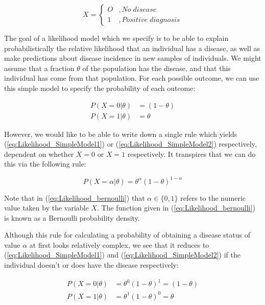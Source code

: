 \documentclass[11pt,fullpage]{book}
\begin{document}
\begin{equation}
X =
\begin{cases}
O & , No\; disease \\
1 & , Positive \; diagnosis
\end{cases}
\end{equation}

The goal of a likelihood model which we specify is to be able to explain probabilistically the relative likelihood that an individual has a disease, as well as make predictions about disease incidence in new samples of individuals. We might assume that a fraction $\theta$ of the population has the disease, and that this individual has come from that population. For each possible outcome, we can use this simple model to specify the probability of each outcome:

\begin{align}\label{eq:Likelihood_SimpleModel1}
P(X = 0|\theta)& = (1-\theta)\\
P(X = 1|\theta)& = \theta\label{eq:Likelihood_SimpleModel2}
\end{align}

However, we would like to be able to write down a single rule which yields (\ref{eq:Likelihood_SimpleModel1}) or (\ref{eq:Likelihood_SimpleModel2}) respectively, dependent on whether $X=0$ or $X=1$ respectively. It transpires that we can do this via the following rule:

\begin{equation}\label{eq:Likelihood_bernoulli}
P(X=\alpha|\theta) = \theta^\alpha(1-\theta)^{1-\alpha}
\end{equation}

Note that in (\ref{eq:Likelihood_bernoulli}) that $\alpha\in\{0,1\}$ refers to the numeric value taken by the variable $X$. The function given in (\ref{eq:Likelihood_bernoulli}) is known as a Bernoulli probability density.

Although this rule for calculating a probability of obtaining a disease status of value $\alpha$ at first looks relatively complex, we see that it reduces to (\ref{eq:Likelihood_SimpleModel1}) and (\ref{eq:Likelihood_SimpleModel2}) if the individual doesn't or does have the disease respectively:

\begin{align}\label{eq:Likelihood_SimpleModel3}
P(X = 0|\theta)& = \theta^0(1-\theta)^1 = (1-\theta)\\
P(X = 1|\theta)& = \theta^1(1-\theta)^0 = \theta\label{eq:Likelihood_SimpleModel4}
\end{align}
\end{document}
